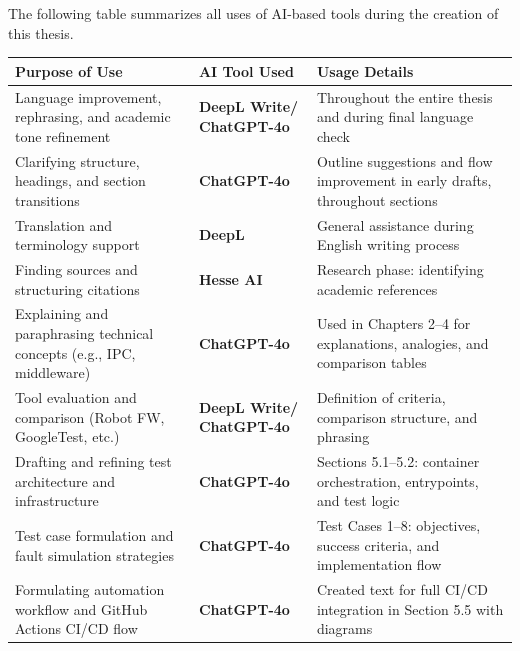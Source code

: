 \documentclass[a4paper,12pt,singlespacing]{article}
\begin{document}
The following table summarizes all uses of AI-based tools during the creation of this thesis.

\vspace{1cm}

\renewcommand{\arraystretch}{1.4} 
\begin{longtable}{|>{\raggedright\arraybackslash}p{4.6cm}|>{\raggedright\arraybackslash}p{2.9cm}|>{\raggedright\arraybackslash}p{5cm}|}
	\hline
	\textbf{Purpose of Use} & \textbf{AI Tool Used} & \textbf{Usage Details} \\
	\hline
	Language improvement, rephrasing, and academic tone refinement & \textbf{DeepL Write/ ChatGPT-4o} & Throughout the entire thesis and during final language check \\
	\hline
	Clarifying structure, headings, and section transitions & \textbf{ChatGPT-4o} & Outline suggestions and flow improvement in early drafts, throughout sections \\
	\hline
	Translation and terminology support & \textbf{DeepL} & General assistance during English writing process \\
	\hline
	Finding sources and structuring citations & \textbf{Hesse AI} & Research phase: identifying academic references \\
	\hline
	Explaining and paraphrasing technical concepts (e.g., IPC, middleware) & \textbf{ChatGPT-4o} & Used in Chapters 2–4 for explanations, analogies, and comparison tables \\
	\hline
	Tool evaluation and comparison (Robot FW, GoogleTest, etc.) & \textbf{DeepL Write/ ChatGPT-4o} & Definition of criteria, comparison structure, and phrasing \\
	\hline
	Drafting and refining test architecture and infrastructure & \textbf{ChatGPT-4o} & Sections 5.1–5.2: container orchestration, entrypoints, and test logic \\
	\hline
	Test case formulation and fault simulation strategies & \textbf{ChatGPT-4o} & Test Cases 1–8: objectives, success criteria, and implementation flow \\
	\hline
	Formulating automation workflow and GitHub Actions CI/CD flow & \textbf{ChatGPT-4o} & Created text for full CI/CD integration in Section 5.5 with diagrams \\
	\hline
\end{longtable}
\end{document}
